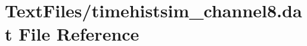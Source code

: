 \hypertarget{TextFiles_2timehistsim__channel8_8dat}{}\section{Text\+Files/timehistsim\+\_\+channel8.dat File Reference}
\label{TextFiles_2timehistsim__channel8_8dat}
